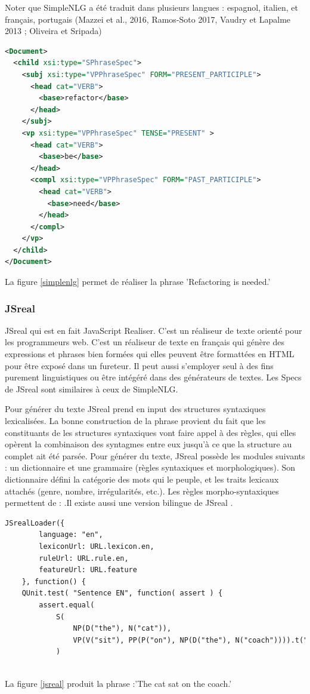 Noter que SimpleNLG a été traduit dans plusieurs langues : espagnol, italien, et français, portugais (Mazzei et al., 2016, Ramos-Soto 2017, Vaudry et Lapalme 2013 ; Oliveira et Sripada)

\begin{lstlisting}[language=Xml, caption=Structure d'input dans SimpleNLG, label=simplenlg]
<Document>
  <child xsi:type="SPhraseSpec">
    <subj xsi:type="VPPhraseSpec" FORM="PRESENT_PARTICIPLE">
      <head cat="VERB">
        <base>refactor</base>
      </head>
    </subj>
    <vp xsi:type="VPPhraseSpec" TENSE="PRESENT" >
      <head cat="VERB">
        <base>be</base>
      </head>
      <compl xsi:type="VPPhraseSpec" FORM="PAST_PARTICIPLE">
        <head cat="VERB">
          <base>need</base>
        </head>
      </compl>
    </vp>
  </child>
</Document>
\end{lstlisting}
La figure \ref{simplenlg} permet de réaliser la phrase 'Refactoring is needed.'

\subsubsection{JSreal}
JSreal \citep{DaoustJSREALTextRealizer2015} qui est en fait JavaScript Realiser. C'est un réaliseur de texte orienté pour les programmeurs web. C'est un réaliseur de texte en français qui génère des expressions et phrases bien formées qui elles peuvent être formattées en HTML pour être exposé dans un fureteur. Il peut aussi s'employer seul à des fins purement linguistiques ou être intégéré dans des générateurs de textes. Les Specs de JSreal sont similaires à ceux de SimpleNLG.

Pour générer du texte JSreal prend en input des structures syntaxiques lexicalisées. La bonne construction de la phrase provient du fait que les constituants de les structures syntaxiques vont faire appel à des règles, qui elles opèrent la combinaison des syntagmes entre eux jusqu'à ce que la structure au complet ait été parsée. Pour générer du texte, JSreal possède les modules suivants : un dictionnaire et une grammaire (règles syntaxiques et morphologiques). Son dictionnaire défini la catégorie des mots qui le peuple, et les traits lexicaux attachés (genre, nombre, irrégularités, etc.). Les règles morpho-syntaxiques permettent de : .Il existe aussi une version bilingue de JSreal \citep{MolinsJSrealBBilingualText2015}.

\begin{lstlisting}[language=Xml, caption=JSreal, label=jsreal]
JSrealLoader({
        language: "en",
        lexiconUrl: URL.lexicon.en,
        ruleUrl: URL.rule.en,
        featureUrl: URL.feature
    }, function() {
    QUnit.test( "Sentence EN", function( assert ) {
        assert.equal(
            S(
                NP(D("the"), N("cat")),
                VP(V("sit"), PP(P("on"), NP(D("the"), N("coach")))).t("ps")
            )
        
\end{lstlisting}
La figure \ref{jsreal} produit la phrase :'The cat sat on the coach.'
		
